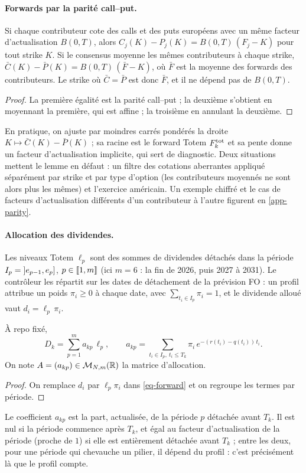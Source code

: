 \paragraph{Forwards par la parité call--put.}
\begin{lemma}\label{lem-parity}
Si chaque contributeur cote des calls et des puts européens avec un même facteur d'actualisation $B(0, T)$, alors
$C_j(K)-P_j(K)=B(0, T)\,(F_j-K)$ pour tout strike $K$. Si le consensus moyenne les mêmes contributeurs à chaque strike,
$\bar C(K)-\bar P(K)=B(0, T)\,(\bar F-K)$, où $\bar F$ est la moyenne des forwards des contributeurs. Le strike où
$\bar C=\bar P$ est donc $\bar F$, et il ne dépend pas de $B(0, T)$.
\end{lemma}
\begin{proof}
La première égalité est la parité call--put ; la deuxième s'obtient en moyennant la première, qui est affine ; la
troisième en annulant la deuxième.
\end{proof}
En pratique, on ajuste par moindres carrés pondérés la droite $K\mapsto\bar C(K)-\bar P(K)$ ; sa racine est le forward
Totem $F^{\mathrm{tot}}_k$ et sa pente donne un facteur d'actualisation implicite, qui sert de diagnostic. Deux situations
mettent le lemme en défaut : un filtre des cotations aberrantes appliqué séparément par strike et par type d'option (les
contributeurs moyennés ne sont alors plus les mêmes) et l'exercice américain. Un exemple chiffré et le cas de facteurs
d'actualisation différents d'un contributeur à l'autre figurent en \cref{app-parity}.

\paragraph{Allocation des dividendes.} Les niveaux Totem $\ell_p$ sont des sommes de dividendes détachés dans la
période $I_p=\mathopen{]}e_{p-1}, e_p\mathclose{]}$, $p\in\llbracket 1, m\rrbracket$ (ici $m=6$ : la fin de 2026, puis 2027 à 2031). Le contrôleur les
répartit sur les dates de détachement de la prévision FO : un profil attribue un poids $\pi_i\ge0$ à chaque date, avec
$\sum_{t_i\in I_p}\pi_i=1$, et le dividende alloué vaut $d_i=\ell_p\,\pi_i$.

\begin{lemma}[Allocation]\label{lem-allocation}
À repo fixé,
\[
D_k=\sum_{p=1}^m a_{kp}\,\ell_p, \qquad a_{kp}=\sum_{t_i\in I_p,\ t_i\le T_k}\pi_i\,e^{-(r(t_i)-q(t_i))\,t_i} .
\]
On note $A=(a_{kp})\in\mathcal{M}_{N,m}(\mathbb{R})$ la matrice d'allocation.
\end{lemma}
\begin{proof}
On remplace $d_i$ par $\ell_p\pi_i$ dans \eqref{eq-forward} et on regroupe les termes par période.
\end{proof}
Le coefficient $a_{kp}$ est la part, actualisée, de la période $p$ détachée avant $T_k$. Il est nul si la période
commence après $T_k$, et égal au facteur d'actualisation de la période (proche de $1$) si elle est entièrement détachée
avant $T_k$ ; entre les deux, pour une période qui chevauche un pilier, il dépend du profil : c'est précisément là que
le profil compte.

